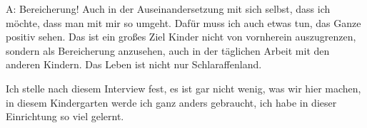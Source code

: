 \begin{linenumbers*}
A: Bereicherung! Auch in der Auseinandersetzung mit sich selbst, dass ich möchte, dass man mit mir so umgeht. Dafür muss ich auch etwas tun, das Ganze positiv sehen. Das ist ein großes Ziel Kinder nicht von vornherein auszugrenzen, sondern als Bereicherung anzusehen, auch in der täglichen Arbeit mit den anderen Kindern. Das Leben ist nicht nur Schlaraffenland.  

Ich stelle nach diesem Interview fest, es ist gar nicht wenig, was wir hier machen, in diesem Kindergarten werde ich ganz anders gebraucht,  ich habe in dieser Einrichtung so viel gelernt.   
\end{linenumbers*}

